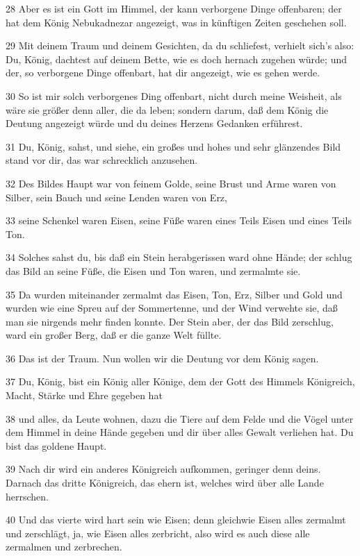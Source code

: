 \par 28 Aber es ist ein Gott im Himmel, der kann verborgene Dinge offenbaren; der hat dem König Nebukadnezar angezeigt, was in künftigen Zeiten geschehen soll.
\par 29 Mit deinem Traum und deinem Gesichten, da du schliefest, verhielt sich's also: Du, König, dachtest auf deinem Bette, wie es doch hernach zugehen würde; und der, so verborgene Dinge offenbart, hat dir angezeigt, wie es gehen werde.
\par 30 So ist mir solch verborgenes Ding offenbart, nicht durch meine Weisheit, als wäre sie größer denn aller, die da leben; sondern darum, daß dem König die Deutung angezeigt würde und du deines Herzens Gedanken erführest.
\par 31 Du, König, sahst, und siehe, ein großes und hohes und sehr glänzendes Bild stand vor dir, das war schrecklich anzusehen.
\par 32 Des Bildes Haupt war von feinem Golde, seine Brust und Arme waren von Silber, sein Bauch und seine Lenden waren von Erz,
\par 33 seine Schenkel waren Eisen, seine Füße waren eines Teils Eisen und eines Teils Ton.
\par 34 Solches sahst du, bis daß ein Stein herabgerissen ward ohne Hände; der schlug das Bild an seine Füße, die Eisen und Ton waren, und zermalmte sie.
\par 35 Da wurden miteinander zermalmt das Eisen, Ton, Erz, Silber und Gold und wurden wie eine Spreu auf der Sommertenne, und der Wind verwehte sie, daß man sie nirgends mehr finden konnte. Der Stein aber, der das Bild zerschlug, ward ein großer Berg, daß er die ganze Welt füllte.
\par 36 Das ist der Traum. Nun wollen wir die Deutung vor dem König sagen.
\par 37 Du, König, bist ein König aller Könige, dem der Gott des Himmels Königreich, Macht, Stärke und Ehre gegeben hat
\par 38 und alles, da Leute wohnen, dazu die Tiere auf dem Felde und die Vögel unter dem Himmel in deine Hände gegeben und dir über alles Gewalt verliehen hat. Du bist das goldene Haupt.
\par 39 Nach dir wird ein anderes Königreich aufkommen, geringer denn deins. Darnach das dritte Königreich, das ehern ist, welches wird über alle Lande herrschen.
\par 40 Und das vierte wird hart sein wie Eisen; denn gleichwie Eisen alles zermalmt und zerschlägt, ja, wie Eisen alles zerbricht, also wird es auch diese alle zermalmen und zerbrechen.
